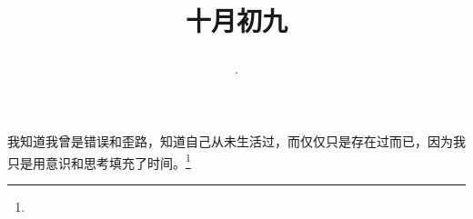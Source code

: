 \title{\date[d=9,m=11,y=2024][year:cn-y,年,month:cn,day:cn,日,·,weekday]·十月初九 }
我知道我曾是错误和歪路，知道自己从未生活过，而仅仅只是存在过而已，因为我只是用意识和思考填充了时间。\footnote{ }

